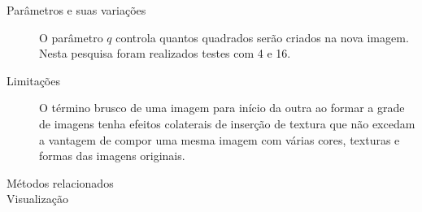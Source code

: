 \begin{description}
  \item[Parâmetros e suas variações] O parâmetro $q$ controla quantos quadrados serão criados na nova imagem. Nesta pesquisa foram realizados testes com 4 e 16.

  \item[Limitações] O término brusco de uma imagem para início da outra ao formar a grade de imagens tenha efeitos colaterais de inserção de textura que não excedam a vantagem de compor uma mesma imagem com várias cores, texturas e formas das imagens originais.

  \item[Métodos relacionados]

  \item[Visualização]
\end{description}
%
%
%
%
